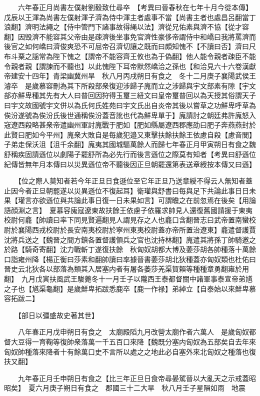 　　六年春正月尚書左僕射劉毅致仕尋卒　【考異曰晉春秋在七年十月今從本傳】　戊辰以王渾為尚書左僕射渾子濟為侍中渾主者處事不當【尚書主者也處昌呂翻當丁浪翻】濟明法繩之【侍中管門下諸事故得䋲以法】濟從兄佑素與濟不協【從才容翻】因毁濟不能容其父帝由是疎濟後坐事免官濟性豪侈帝謂侍中和嶠曰我將罵濟而後官之如何嶠曰濟俊爽恐不可屈帝召濟切讓之既而曰頗知愧不【不讀曰否】濟曰尺布斗粟之謡常為陛下愧之【謂帝不能容齊王攸也為于偽翻】他人能令親者疎臣不能令親者親【謂諫而不聽也】以此愧陛下耳帝默然嶠洽之孫也【和洽見六十六卷漢獻帝建安十四年】青梁幽冀州旱　秋八月丙戌朔日有食之　冬十二月庚子襄陽武侯王濬卒　是歲慕容刪為其下所殺部衆復迎涉歸子廆而立之涉歸與宇文部素有隙【宇文部亦鮮卑種其先有大人曰普回因狩得玉璽三紐文曰皇帝璽普回以為天授其俗謂天子曰宇文故國號宇文併以為氏何氏姓苑曰宇文氏出自炎帝其後以嘗草之功鮮卑呼草為俟汾遂號為俟汾氏後世通稱俟汾蓋音訛也代為鮮卑單于】廆請討之朝廷弗許廆怒入宼遼西殺略甚衆帝遣幽州軍討廆戰于肥如【肥如縣屬遼西郡應劭曰肥子奔燕燕封於此賢曰肥如今平州】廆衆大敗自是每歲犯邉又東擊扶餘扶餘王依慮自殺【慮音閭】子弟走保沃沮【沮千余翻】廆夷其國城驅萬餘人而歸七年春正月甲寅朔日有食之魏舒稱疾固請遜位以劇陽子罷舒所為必先行而後言遜位之際莫有知者【考異曰舒遜位紀傳皆無年月本傳曰以災異遜位帝不聽後因正旦朝罷還第表送章綬按本傳又曰遜】

　　【位之際人莫知者若今年正旦日食遜位至它年正旦乃送章綬不得云人無知者蓋止因今者正旦朝罷遂以災異遜位不復起耳】衛瓘與舒書曰每與足下共論此事日日未果【瓘言亦欲遜位與共論此事日復一日未果如言】可謂瞻之在前忽焉在後矣【用論語顔淵之言】　夏慕容廆寇遼東故扶餘王依慮子依羅求帥見人還復舊國請援于東夷校尉何龕【帥讀曰率下同見賢遍翻見人謂見存之人也龕口含翻晉志曰武帝置南蠻校尉於襄陽西戎校尉於長安南夷校尉於寧州東夷校尉蓋亦帝所置治遼東】龕遣督護賈沈將兵送之【魏晉之間方鎮各置督護領兵之官也沈持林翻】廆遣其將孫丁帥騎邀之於路【騎奇寄翻】沈力戰斬丁遂復扶餘　秋匈奴胡都大博及萎莎胡各帥種落十萬餘口詣雍州降【楊正衡曰莎素和翻帥讀曰率據晉書萎莎胡北狄種蓋亦匈奴類也杜佑曰晉史云北狄各以部落為類其入居塞内者有屠各萎莎羌渠賀賴等種種章勇翻雍於用翻】　九月戊寅扶風武王駿薨冬十一月壬子以隴西王泰都督關中諸軍事泰宣帝弟馗之子也【馗渠龜翻】是歲鮮卑拓跋悉鹿卒【鹿一作禄】弟綽立【自泰始以來鮮卑慕容拓跋二】

　　【部日以彊盛故史著其世】

　　八年春正月戊申朔日有食之　太廟殿䧟九月改營太廟作者六萬人　是歲匈奴都督大豆得一育鞠等復帥衆落萬一千五百口來降【魏既分塞内匈奴為五部矣自去年來匈奴帥種落來降者十有餘萬口史不言所以處之之地此必自塞外來北匈奴之種落也復扶又翻】

　　九年春正月壬申朔日有食之【比三年正旦日食帝尋晏駕晉以大亂天之示戒蓋昭昭矣】　夏六月庚子朔日有食之　郡國三十二大旱　秋八月壬子星隕如雨　地震

